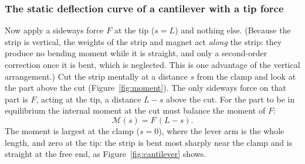 \documentclass[11pt,a4paper]{article}
\begin{document}
\subsubsection{The static deflection curve of a cantilever with a tip force}

Now apply a sideways force $F$ at the tip ($s=L$) and nothing else. (Because the strip is vertical, the weights of the strip and magnet act \emph{along} the strip: they produce no bending moment while it is straight, and only a second-order correction once it is bent, which is neglected. This is one advantage of the vertical arrangement.) Cut the strip mentally at a distance $s$ from the clamp and look at the part above the cut (Figure~\ref{fig:moment}). The only sideways force on that part is $F$, acting at the tip, a distance $L-s$ above the cut. For the part to be in equilibrium the internal moment at the cut must balance the moment of $F$:
\begin{equation}
\mathcal M(s)=F\,(L-s).
\label{eq:Ms}
\end{equation}
The moment is largest at the clamp ($s=0$), where the lever arm is the whole length, and zero at the tip: the strip is bent most sharply near the clamp and is straight at the free end, as Figure~\ref{fig:cantilever} shows.
\end{document}
